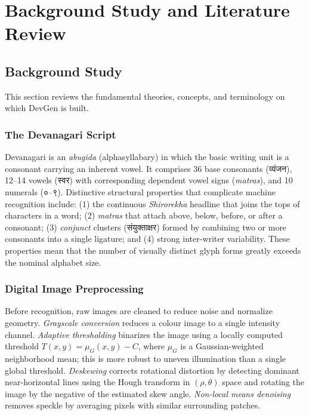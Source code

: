 \documentclass[12pt,a4paper]{report}
\newcommand{\dev}[1]{{\devfont #1}}
\begin{document}
\chapter{Background Study and Literature Review}

\section{Background Study}
This section reviews the fundamental theories, concepts, and terminology on which DevGen is built.

\subsection{The Devanagari Script}
Devanagari is an \textit{abugida} (alphasyllabary) in which the basic writing unit is a consonant carrying an inherent vowel. It comprises 36 base consonants (\dev{व्यंजन}), 12--14 vowels (\dev{स्वर}) with corresponding dependent vowel signs (\textit{matras}), and 10 numerals (\dev{०}--\dev{९}). Distinctive structural properties that complicate machine recognition include: (1) the continuous \textit{Shirorekha} headline that joins the tops of characters in a word; (2) \textit{matras} that attach above, below, before, or after a consonant; (3) \textit{conjunct} clusters (\dev{संयुक्ताक्षर}) formed by combining two or more consonants into a single ligature; and (4) strong inter-writer variability. These properties mean that the number of visually distinct glyph forms greatly exceeds the nominal alphabet size.

\subsection{Digital Image Preprocessing}
Before recognition, raw images are cleaned to reduce noise and normalize geometry. \textit{Grayscale conversion} reduces a colour image to a single intensity channel. \textit{Adaptive thresholding} binarizes the image using a locally computed threshold $T(x,y) = \mu_G(x,y) - C$, where $\mu_G$ is a Gaussian-weighted neighborhood mean; this is more robust to uneven illumination than a single global threshold. \textit{Deskewing} corrects rotational distortion by detecting dominant near-horizontal lines using the Hough transform in $(\rho,\theta)$ space and rotating the image by the negative of the estimated skew angle. \textit{Non-local means denoising} removes speckle by averaging pixels with similar surrounding patches.
\end{document}
